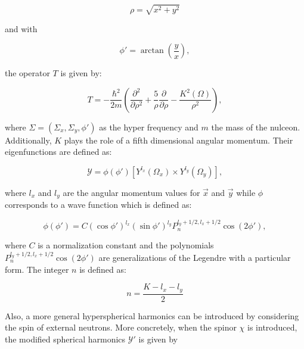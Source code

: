 \documentclass[openany]{book}
\begin{document}
\begin{equation}\label{eq:micro_cluster_breakup_rho}
	\rho = \sqrt{x^2 + y^2}
\end{equation}

and with 

\begin{equation}\label{eq:micro_cluster_breakup_phi}
	\phi' = \arctan \left( \frac{y}{x}\right),
\end{equation}

the operator  $T$ is given by:

\begin{equation}\label{eq:micro_cluster_breakup_kinetic}
	T = -\frac{\hbar^2}{2m} \left( \frac{\partial^2}{\partial \rho^2}  + \frac{5}{\rho} \frac{\partial }{\partial \rho} - \frac{K^2(\Omega)}{\rho^2}\right),
\end{equation} 

where $\Sigma = (\Sigma_x, \Sigma_y, \phi')$ as the hyper frequency and $m$ the mass of the nulceon. Additionally, $K$ plays the role of a fifth dimensional angular momentum. Their eigenfunctions are defined as: 

\begin{equation}\label{eq:micro_cluster_breakup_hyperspherical}
	\mathcal{Y} = \phi (\phi') [Y^{l_x}(\Omega_x) \times Y^{l_y} (\Omega_y)],
\end{equation}

where $l_x$ and $l_y$ are the angular momentum values for $\vec x$ and $\vec y$ while $\phi$ corresponds to a wave function which is defined as: 

\begin{equation}\label{eq:micro_cluster_breakup_wavefunction}
	\phi(\phi')  = C (\cos \phi')^{l_x}   (\sin \phi')^{l_y} P_n^{l_y + 1/2, l_x + 1/2} \cos (2\phi'),
\end{equation}

where $C$ is a normalization constant and the polynomials $P_n^{l_y + 1/2, l_x + 1/2} \cos (2\phi')$ are generalizations of the Legendre with a particular form. The integer $n$ is defined as: 

\begin{equation}\label{eq:micro_cluster_breakup_n}
	n = \frac{K - l_x - l_y}{2}
\end{equation}

Also, a more general hyperspherical harmonics can be introduced by considering the spin of external neutrons. More concretely, when the spinor $\chi$ is introduced, the modified spherical harmonics $\mathcal{Y}'$ is given by 
\end{document}
